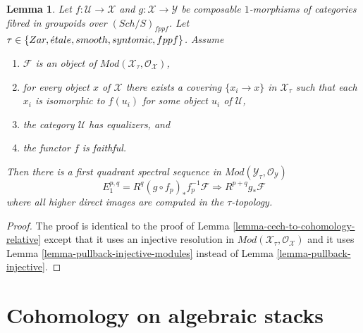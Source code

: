\documentclass{stacks-project}
\theoremstyle{plain}
\newtheorem{lemma}[subsection]{Lemma}
\theoremstyle{definition}
\theoremstyle{remark}
\numberwithin{equation}{subsection}
\def\Sch{\mathit{Sch}}
\def\etale{{\acute{e}tale}}
\begin{document}
\begin{lemma}
\label{lemma-cech-to-cohomology-relative-modules}
Let $f : \mathcal{U} \to \mathcal{X}$ and
$g : \mathcal{X} \to \mathcal{Y}$
be composable $1$-morphisms of categories fibred
in groupoids over $(\Sch/S)_{fppf}$. Let
$\tau \in \{Zar, \etale, smooth, syntomic, \linebreak[0] fppf\}$.
Assume
\begin{enumerate}
\item $\mathcal{F}$ is an object of
$\textit{Mod}(\mathcal{X}_\tau, \mathcal{O}_\mathcal{X})$,
\item for every object $x$ of $\mathcal{X}$ there exists a covering
$\{x_i \to x\}$ in $\mathcal{X}_\tau$ such that each $x_i$ is isomorphic
to $f(u_i)$ for some object $u_i$ of $\mathcal{U}$,
\item the category $\mathcal{U}$ has equalizers, and
\item the functor $f$ is faithful.
\end{enumerate}
Then there is a first quadrant spectral sequence in
$\textit{Mod}(\mathcal{Y}_\tau, \mathcal{O}_\mathcal{Y})$
$$
E_1^{p, q} = R^q(g \circ f_p)_*f_p^{-1}\mathcal{F}
\Rightarrow
R^{p + q}g_*\mathcal{F}
$$
where all higher direct images are computed in the $\tau$-topology.
\end{lemma}

\begin{proof}
The proof is identical to the proof of
Lemma \ref{lemma-cech-to-cohomology-relative}
except that it uses an injective resolution in
$\textit{Mod}(\mathcal{X}_\tau, \mathcal{O}_\mathcal{X})$
and it uses
Lemma \ref{lemma-pullback-injective-modules}
instead of
Lemma \ref{lemma-pullback-injective}.
\end{proof}






\section{Cohomology on algebraic stacks}
\label{section-cohomology}
\end{document}
